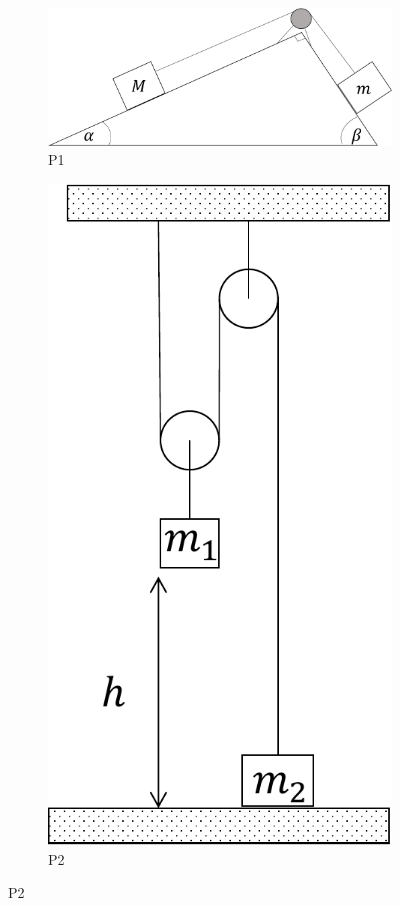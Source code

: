 \documentclass[letterpaper,11pt]{article}
\begin{document}
\begin{enumerate}
\begin{figure}[h!]
    \centering
    \begin{subfigure}[t]{0.4\textwidth}
        \centering
        \includegraphics[width=0.9\linewidth]{2021-1/Imagenes/aux6/p1.pdf}
        \caption{P1}
        \label{fig:p1}
    \end{subfigure}
    \hspace{0.5em}
    \begin{subfigure}[t]{0.15\textwidth}
        \centering
        \includegraphics[width=0.75\linewidth]{2021-1/Imagenes/aux6/p2.pdf}
        \caption{P2}
        \label{fig:p2}
    \end{subfigure}
\end{figure}


\end{enumerate}
\end{document}
